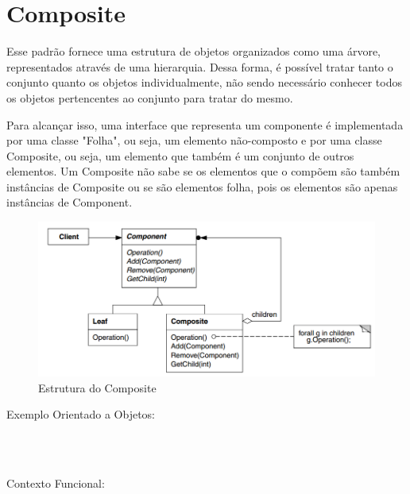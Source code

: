 \section{Composite}

Esse padrão fornece uma estrutura de objetos organizados como uma 
árvore, representados através de uma hierarquia. Dessa forma, é 
possível tratar tanto o conjunto quanto os objetos individualmente, 
não sendo necessário conhecer todos os objetos pertencentes ao conjunto 
para tratar do mesmo.

Para alcançar isso, uma interface que representa um componente é 
implementada por uma classe "Folha", ou seja, um elemento não-composto 
e por uma classe Composite, ou seja, um elemento que também é um 
conjunto de outros elementos. Um Composite não sabe se os elementos 
que o compõem são também instâncias de Composite ou se são elementos 
folha, pois os elementos são apenas instâncias de Component.

\begin{figure}[htb]
	\caption{\label{composite_struct}Estrutura do Composite}
	\begin{center}
	    \includegraphics[scale=0.5]{5_padroes-contexto-funcional/5.2_estruturais/5.2.3_composite/diagram.png}
	\end{center}
\end{figure}

Exemplo Orientado a Objetos:

\begin{lstlisting}[caption={Composite Orientado a Objetos},label=oocomposite]



\end{lstlisting}

Contexto Funcional:



\begin{lstlisting}[caption={Composite Funcional},label=fpcomposite]
    

    
\end{lstlisting}